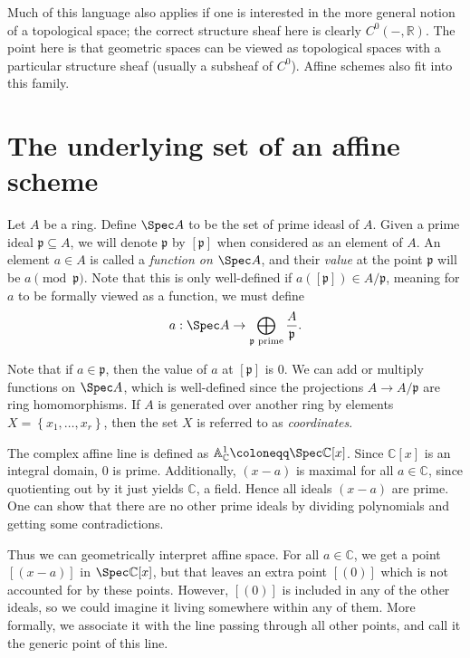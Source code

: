 Much of this language also applies if one is interested in the more general notion of a topological space; the correct structure sheaf here is clearly $C^0(-,\mathbb{R})$. The point here is that geometric spaces can be viewed as topological spaces with a particular structure sheaf (usually a subsheaf of $C^0$). Affine schemes also fit into this family.

\section{The underlying set of an affine scheme}

\begin{definition}\label{dfn:3-2-1}
	Let $A$ be a ring. Define $\Spec A$ to be the set of prime ideasl of $A$. Given a prime ideal $\mathfrak{p} \subseteq A$, we will denote $\mathfrak{p} $ by $[\mathfrak{p} ]$ when considered as an element of $A$. An element $a\in A$ is called a \emph{function on $\Spec A$}, and their \emph{value} at the point $\mathfrak{p} $ will be $a\pmod{\mathfrak{p} }$. Note that this is only well-defined if $a([\mathfrak{p} ])\in A/\mathfrak{p} $, meaning for $a$ to be formally viewed as a function, we must define
	\[
		a : \Spec A \to \bigoplus_{\mathfrak{p} \text{ prime} } \frac{A}{\mathfrak{p} } 
	.\]
\end{definition}

Note that if $a\in \mathfrak{p} $, then the value of $a$ at $[\mathfrak{p} ]$ is 0. We can add or multiply functions on $\Spec A$, which is well-defined since the projections $A \to A/\mathfrak{p} $ are ring homomorphisms. If $A$ is generated over another ring by elements $X=\left\{ x_1, \ldots ,x_r \right\} $, then the set $X$ is referred to as \emph{coordinates}.

\begin{example}\label{ex:3-2-2}
	The complex affine line is defined as $\mathbb{A} _{\mathbb{C} } ^1 \coloneqq \Spec\mathbb{C} [x]$. Since $\mathbb{C} [x]$ is an integral domain, $0$ is prime. Additionally, $(x-a)$ is maximal for all $a\in\mathbb{C} $, since quotienting out by it just yields $\mathbb{C} $, a field. Hence all ideals $(x-a)$ are prime. One can show that there are no other prime ideals by dividing polynomials and getting some contradictions.

	Thus we can geometrically interpret affine space. For all $a\in\mathbb{C}$, we get a point $[(x-a)]$ in $\Spec\mathbb{C} [x]$, but that leaves an extra point $[(0)]$ which is not accounted for by these points. However, $[(0)]$ is included in any of the other ideals, so we could imagine it living somewhere within any of them. More formally, we associate it with the line passing through all other points, and call it the generic point of this line.
\end{example}

